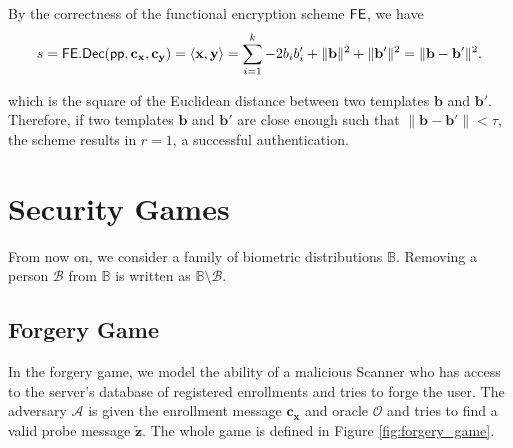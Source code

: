 By the correctness of the functional encryption scheme $\sf FE$, we have
\[
	s = {\sf FE.Dec}({\sf pp}, \mathbf{c_x}, \mathbf{c_y}) = \langle \mathbf{x}, \mathbf{y} \rangle = \sum_{i=1}^k -2b_ib_i' + \|\mathbf{b}\|^2 + \|\mathbf{b'}\|^2 = \| \mathbf{b} - \mathbf{b'} \|^2.
\]

which is the square of the Euclidean distance between two templates $\mathbf{b}$ and $\mathbf{b}'$. Therefore, if two templates $\mathbf{b}$ and $\mathbf{b}'$ are close enough such that $\|\mathbf{b} - \mathbf{b'}\| < \tau$, the scheme results in $r = 1$, a successful authentication.



\section{Security Games}

From now on, we consider a family of biometric distributions $\mathbb{B}$. Removing a person $\mathcal{B}$ from $\mathbb{B}$ is written as $\mathbb{B} \setminus \mathcal{B}$.

\subsection{Forgery Game}
\label{sec:forgery_game}

In the forgery game, we model the ability of a malicious {\sf Scanner} who has access to the server's database of registered enrollments and tries to forge the user. The adversary $\mathcal{A}$ is given the enrollment message $\mathbf{c_x}$ and oracle $\mathcal{O}$ and tries to find a valid probe message $\mathbf{\tilde{z}}$. The whole game is defined in Figure \ref{fig:forgery_game}.


